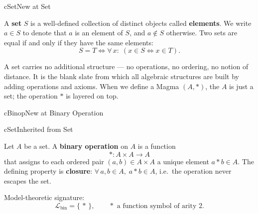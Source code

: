 \begin{bpnew}{cSet}{New at Set}
\end{bpnew}

\begin{definition}[Set]
  A \textbf{set} $S$ is a well-defined collection of distinct objects called
  \textbf{elements}.  We write $a \in S$ to denote that $a$ is an element of
  $S$, and $a \notin S$ otherwise.  Two sets are equal if and only if they
  have the same elements:
  \[
    S = T \iff \forall\,x:\; (x \in S \iff x \in T).
  \]
\end{definition}

\begin{remark}
  A set carries no additional structure — no operations, no ordering, no notion
  of distance.  It is the blank slate from which all algebraic structures are
  built by adding operations and axioms.  When we define a Magma $(A, *)$,
  the $A$ is just a set; the operation $*$ is layered on top.
\end{remark}



\clearpage\thispagestyle{plain}

\begin{bpnew}{cBinop}{New at Binary Operation}
\end{bpnew}

\begin{bpinh}{cSet}{Inherited from Set}
\end{bpinh}

\begin{definition}
  Let $A$ be a set.  A \textbf{binary operation} on $A$ is a function
  \[
    * : A \times A \to A
  \]
  that assigns to each ordered pair $(a, b) \in A \times A$ a unique element
  $a * b \in A$.  The defining property is \textbf{closure}:
  $\forall\,a, b \in A,\; a * b \in A$, i.e.\ the operation never escapes the
  set.

  \medskip\noindent
  Model-theoretic signature:
  \[
    \mathcal{L}_{\mathrm{bin}} = \{\,*\,\},
    \qquad * \text{ a function symbol of arity } 2.
  \]
\end{definition}

